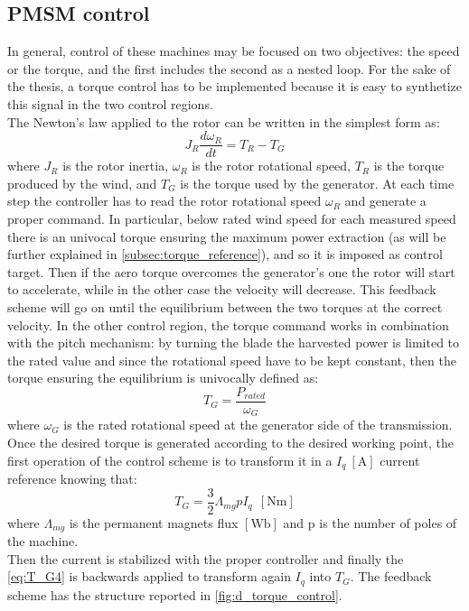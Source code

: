 \subsection{PMSM control}\label{subsec:PMSM_control}
In general, control of these machines may be focused on two objectives: the speed or the torque, and the first includes the second as a nested loop. For the sake of the thesis, a torque control has to be implemented because it is easy to synthetize this signal in the two control regions. \\
The Newton's law applied to the rotor can be written in the simplest form as:
\begin{equation}
    J_R\frac{d\omega_R}{dt}=T_R-T_G
    \label{eq:simple_dynamic}
\end{equation}
where $J_R$ is the rotor inertia, $\omega_R$ is the rotor rotational speed, $T_R$ is the torque produced by the wind, and $T_G$ is the torque used by the generator. At each time step the controller has to read the rotor rotational speed $\omega_R$ and generate a proper command. In particular, below rated wind speed for each measured speed there is an univocal torque ensuring the maximum power extraction (as will be further explained in \autoref{subsec:torque_reference}), and so it is imposed as control target. Then if the aero torque overcomes the generator's one the rotor will start to accelerate, while in the other case the velocity will decrease. This feedback scheme will go on until the equilibrium between the two torques at the correct velocity. In the other control region, the torque command works in combination with the pitch mechanism: by turning the blade the harvested power is limited to the rated value and since the rotational speed have to be kept constant, then the torque ensuring the equilibrium is univocally defined as: 
\begin{equation}
    T_G=\frac{P_{rated}}{\omega_G}
    \label{eq:simple_torque}
\end{equation}
where $\omega_G$ is the rated rotational speed at the generator side of the transmission. \\

Once the desired torque is generated according to the desired working point, the first operation of the control scheme is to transform it in a $I_q \ \left[\si{\ampere}\right]$ current reference knowing that:
\begin{equation}
    T_G = \frac{3}{2}\Lambda_{mg} p I_q \ \ \left[\si{\newton\meter}\right]
    \label{eq:T_G4}
\end{equation}
where $\Lambda_{mg}$ is the permanent magnets flux $\left[\si{\weber}\right]$ and p is the number of poles of the machine.\\
Then the current is stabilized with the proper controller and finally the \autoref{eq:T_G4} is backwards applied to transform again $I_q$ into $T_G$. The feedback scheme has the structure reported in \autoref{fig:d_torque_control}.

